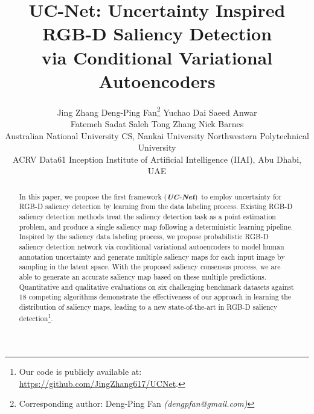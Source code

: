\documentclass[10pt,twocolumn,letterpaper]{article}
\def\ourmodel{\textit{UC-Net}}
\begin{document}
\title{UC-Net: Uncertainty Inspired RGB-D Saliency Detection \\via Conditional Variational Autoencoders
}

\author{
Jing Zhang\quad
Deng-Ping Fan\thanks{Corresponding author: Deng-Ping Fan \emph{(dengpfan@gmail.com)}}\quad
Yuchao Dai\quad
Saeed Anwar\\
Fatemeh Sadat Saleh\quad
Tong Zhang\quad
Nick Barnes\\
 Australian National University \quad
 CS, Nankai University \quad
 Northwestern Polytechnical University \\
 ACRV \quad
 Data61 \quad 
 Inception Institute of Artificial Intelligence (IIAI), Abu Dhabi, UAE\\
}



\def\JZ#1{{\color{red}{\bf [Jing:} {\it{#1}}{\bf ]}}}
\def\YD#1{{\color{blue}{\bf [Yuchao:} {\it{#1}}{\bf ]}}}
\def\SA#1{{\color{red}{\bf [Saeed:} {\it{#1}}{\bf ]}}}
\def\NB#1{{\color{green}{\bf [Nick:} {\it{#1}}{\bf ]}}}
\newcommand{\FS}[1]{\textcolor{magenta}{{\bf #1}}}
\newcommand{\fs}[1]{\textcolor{magenta}{ #1}}
\newcommand{\fdp}[1]{{\textcolor{red}{#1}}}
\def\TZ#1{{\color{cyan}{\bf [Tong:} {\it{#1}}{\bf ]}}}
\maketitle
\thispagestyle{empty}

\begin{abstract}

In this paper, we propose the first framework (\textbf{\ourmodel})~to employ uncertainty for RGB-D saliency detection by learning from the data labeling process. Existing RGB-D saliency detection methods treat the saliency detection task as a point estimation problem, and produce a single saliency map following a deterministic learning pipeline. 
Inspired by the saliency data labeling process, we propose probabilistic RGB-D saliency detection network via conditional variational autoencoders to model human annotation uncertainty
and generate multiple saliency maps for each input image by sampling in the latent space. 
With the proposed saliency consensus process, we are able to generate an accurate saliency map based on these multiple predictions. 
Quantitative and qualitative evaluations on six challenging benchmark datasets against 18 competing algorithms demonstrate the effectiveness of our approach in learning the distribution of saliency maps, leading to a new state-of-the-art in RGB-D saliency detection\footnote{Our code is publicly available at: \url{https://github.com/JingZhang617/UCNet}.}.
 



\end{abstract}
\end{document}

